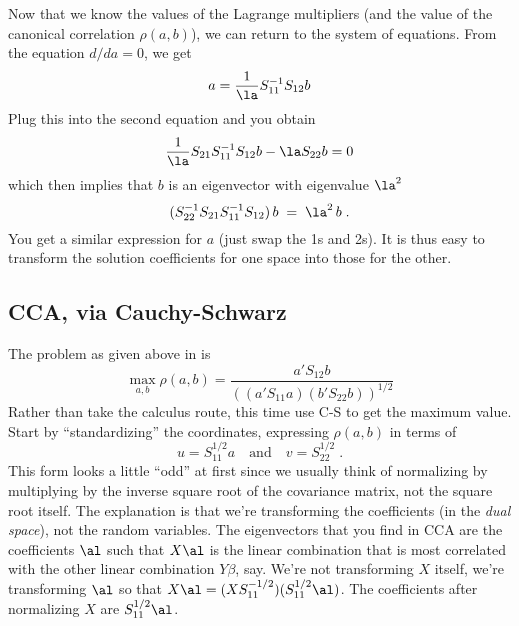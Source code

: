 \documentclass[12pt]{article}
\begin{document}
 Now that we know the values of the Lagrange multipliers (and the value of 
the canonical correlation $\rho(a,b)$), we can return to the
system of equations.  From the equation $d/da = 0$, we get
 \begin{displaymath}
    a = \frac{1}{\la} S_{11}^{-1} S_{12} b   
 \end{displaymath}
 Plug this into the second equation and you obtain
 \begin{displaymath}
   \frac{1}{\la} S_{21}S_{11}^{-1}S_{12} b - \la S_{22} b = 0
 \end{displaymath}
 which then implies that $b$ is an eigenvector with eigenvalue $\la^2$
 \begin{displaymath}
   (S_{22}^{-1} S_{21} S_{11}^{-1} S_{12}) \, b \; = \; \la^2 \, b \;.
 \end{displaymath}
 You get a similar expression for $a$ (just swap the 1s and 2s).  It is thus easy to transform the solution coefficients for one space into those for the other.


\subsection{CCA, via Cauchy-Schwarz}

The problem as given above in  is 
 \begin{equation}
    \max_{a,b} \rho(a,b)=
               \frac{a'S_{12}b}
                    {\left((a'S_{11}a)(b'S_{22}b)\right)^{1/2}}
 \end{equation}
 Rather than take the calculus route, this time use C-S to get the maximum
 value.  Start by ``standardizing'' the coordinates, expressing $\rho(a,b)$ in
 terms of
 \begin{displaymath}
     u = S_{11}^{1/2} a \quad \mbox{and} \quad  v = S_{22}^{1/2} \;.
 \end{displaymath}
 This form looks a little ``odd'' at first since we usually think of normalizing
 by multiplying by the inverse square root of the covariance matrix, not the
 square root itself. The explanation is that we're transforming the coefficients
 (in the {\em dual space}), not the random variables.  The eigenvectors that you
 find in CCA are the coefficients $\al$ such that $X \al$ is the linear
 combination that is most correlated with the other linear combination $Y
 \beta$, say.  We're not transforming $X$ itself, we're transforming $\al$ so
 that $X \al = (X S_{11}^{-1/2})(S_{11}^{1/2} \al)$. The coefficients after
 normalizing $X$ are $S_{11}^{1/2} \al$.
\end{document}

